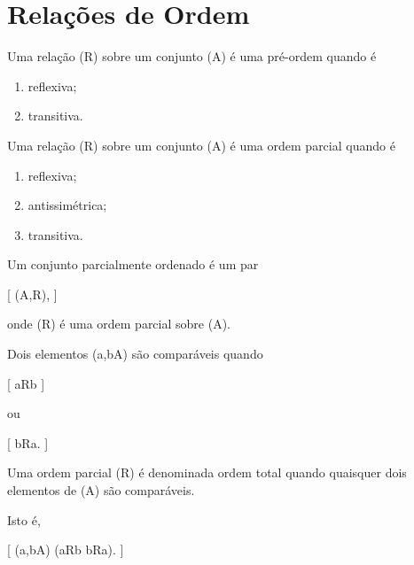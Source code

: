 \documentclass[../../main]{subfiles}
\begin{document}
\section{Relações de Ordem}
\label{sec:matematica:relacoes:relacoes-de-ordem}

\begin{defn}
	\label{def:matematica:relacoes:pre-ordem}

	Uma relação (R) sobre um conjunto (A) é uma pré-ordem quando é

	\begin{enumerate}
		\item reflexiva;
		\item transitiva.
	\end{enumerate}

\end{defn}

\begin{defn}
	\label{def:matematica:relacoes:ordem-parcial}

	Uma relação (R) sobre um conjunto (A) é uma ordem parcial quando
	é

	\begin{enumerate}
		\item reflexiva;
		\item antissimétrica;
		\item transitiva.
	\end{enumerate}

\end{defn}

\begin{defn}
	\label{def:matematica:relacoes:poset}

	Um conjunto parcialmente ordenado é um par

		[
			(A,R),
		]

	onde (R) é uma ordem parcial sobre (A).

\end{defn}

\begin{defn}
	\label{def:matematica:relacoes:comparaveis}

	Dois elementos (a,b\in A) são comparáveis quando

		[
			aRb
		]

	ou

		[
			bRa.
		]

\end{defn}

\begin{defn}
	\label{def:matematica:relacoes:ordem-total}

	Uma ordem parcial (R) é denominada ordem total quando quaisquer
	dois elementos de (A) são comparáveis.

	Isto é,

	[
			(\forall a,b\in A)
			(aRb \lor bRa).
		]

\end{defn}
\end{document}
